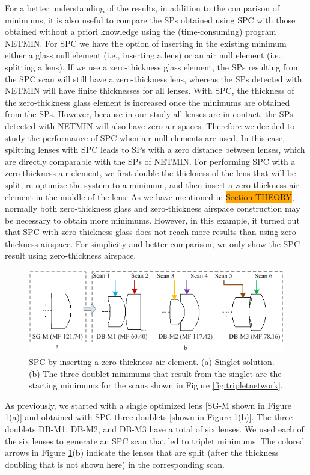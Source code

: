 For a better understanding of the results, in addition to the comparison of minimums, it is also useful to compare the SPs obtained using SPC with those obtained without a priori knowledge using the (time-consuming) program NETMIN. For SPC we have the option of inserting in the existing minimum either a glass null element (i.e., inserting a lens) or an air null element (i.e., splitting a lens). If we use a zero-thickness glass element, the SPs resulting from the SPC scan will still have a zero-thickness lens, whereas the SPs detected with NETMIN will have finite thicknesses for all lenses. With SPC, the thickness of the zero-thickness glass element is increased once the minimums are obtained from the SPs. However, because in our study all lenses are in contact, the SPs detected with NETMIN will also have zero air spaces. Therefore we decided to study the performance of SPC when air null elements are used. In this case, splitting lenses with SPC leads to SPs with a zero distance between lenses, which are directly comparable with the SPs of NETMIN. For performing SPC with a zero-thickness air element, we first double the thickness of the lens that will be split, re-optimize the system to a minimum, and then insert a zero-thickness air element in the middle of the lens. As we have mentioned in \colorbox{orange}{Section THEORY}, normally both zero-thickness glass and zero-thickness airspace construction may be necessary to obtain more minimums. However, in this example, it turned out that SPC with zero-thickness glass does not reach more results than using zero-thickness airspace. For simplicity and better comparison, we only show the SPC result using zero-thickness airspace.
\begin{figure}[h!]
    \centering
    \includegraphics[width=1.0\textwidth]{chapter-3/figures/Single2Double.png}
    \caption{SPC by inserting a zero-thickness air element. (a) Singlet solution. (b) The three doublet minimums that result from the singlet are the starting minimums for the scans shown in Figure \ref{fig:tripletnetwork}.}
    \label{fig:single2double}
\end{figure}
As previously, we started with a single optimized lens [SG-M shown in Figure \ref{fig:single2double}(a)] and obtained with SPC three doublets [shown in Figure \ref{fig:single2double}(b)]. The three doublets DB-M1, DB-M2, and DB-M3 have a total of six lenses. We used each of the six lenses to generate an SPC scan that led to triplet minimums. The colored arrows in Figure \ref{fig:single2double}(b) indicate the lenses that are split (after the thickness doubling that is not shown here) in the corresponding scan.

